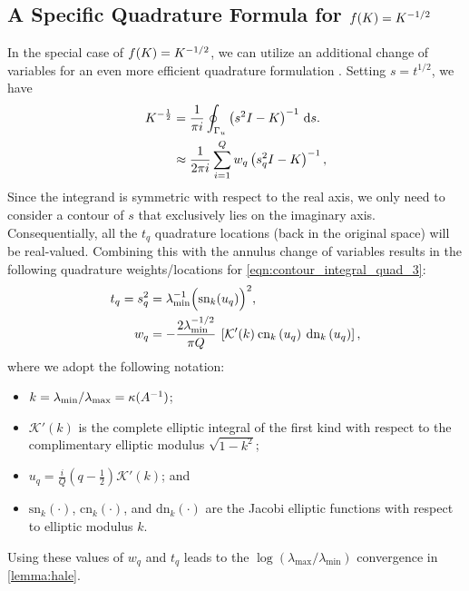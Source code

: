 \subsection{A Specific Quadrature Formula for $f(K) = K^{-1/2}$}
In the special case of $f(K) = K^{-1/2}$, we can utilize an additional change of variables for an even more efficient quadrature formulation \citep[][Sec. 4]{hale2008computing}.
Setting $s = t^{1/2}$, we have
%
\begin{align}
	K^{-\frac 1 2}
  &= \frac{1}{\pi i} \oint_{\Gamma_u} \left( s^2 I - K \right)^{-1} \,\mathrm{d}{s}.
  \nonumber
  \\
  &\approx
  \frac{1}{2 \pi i} \sum_{i=1}^Q w_q \left( s_q^2 I - K \right)^{-1},
  \label{eqn:contour_integral_quad_3}
\end{align}
%
Since the integrand is symmetric with respect to the real axis, we only need to consider a contour of $s$ that exclusively lies on the imaginary axis.
Consequentially, all the $t_q$ quadrature locations (back in the original space) will be real-valued.
Combining this with the annulus change of variables results in the following quadrature weights/locations for \cref{eqn:contour_integral_quad_3}:
%
\begin{equation}
  \begin{split}
    t_q = s_q^2
    &= \lambda_\text{min}^{-1} \Bigl( \text{sn}_k(u_q) \Bigr)^2,
    \\
    w_q
    &= -\frac{ 2 \lambda_\text{min}^{-1/2}  }{ \pi Q }
    \: \left[
    \mathcal{K}'( k )
    \: \text{cn}_k \left( u_q \right)
    \: \text{dn}_k \left( u_q \right)
    \right],
  \end{split}
  \label{eqn:quad_points_and_locations}
\end{equation}
%
where we adopt the following notation:
\begin{itemize}
  \item $k = \lambda_\text{min} / \lambda_\text{max} = \kappa(A^{-1})$;
  \item $\mathcal{K}'(k)$ is the complete elliptic integral of the first kind with respect to the complimentary elliptic modulus $\sqrt{1 - k^2}$;
  \item $u_q = \frac{i}{Q}(q - \frac 1 2) \mathcal{K}'(k)$; and
  \item $\text{sn}_k(\cdot)$, $\text{cn}_k(\cdot)$, and $\text{dn}_k(\cdot)$ are the Jacobi elliptic functions with respect to elliptic modulus $k$.
\end{itemize}
Using these values of $w_q$ and $t_q$ leads to the $\log(\lambda_\text{max} / \lambda_\text{min})$ convergence in \cref{lemma:hale}.

